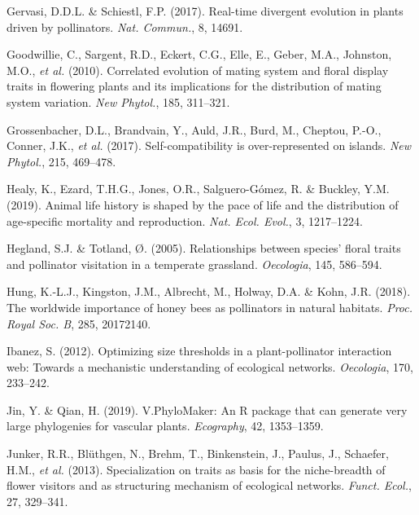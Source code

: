 \documentclass[
  12pt,
  a4paper,
]{article}
\newlength{\cslhangindent}
\newlength{\cslentryspacingunit} %
\newenvironment{CSLReferences}[2] %
 {%
  \setlength{\parindent}{0pt}
  \ifodd #1
  \let\oldpar\par
  \def\par{\hangindent=\cslhangindent\oldpar}
  \fi
  \setlength{\parskip}{#2\cslentryspacingunit}
 }%
 {}
\begin{document}
\begin{CSLReferences}{1}{0}
\leavevmode{}%
Gervasi, D.D.L. \& Schiestl, F.P. (2017). Real-time divergent evolution in plants driven by pollinators. \emph{Nat. Commun.}, 8, 14691.

\leavevmode{}%
Goodwillie, C., Sargent, R.D., Eckert, C.G., Elle, E., Geber, M.A., Johnston, M.O., \emph{et al.} (2010). Correlated evolution of mating system and floral display traits in flowering plants and its implications for the distribution of mating system variation. \emph{New Phytol.}, 185, 311--321.

\leavevmode{}%
Grossenbacher, D.L., Brandvain, Y., Auld, J.R., Burd, M., Cheptou, P.-O., Conner, J.K., \emph{et al.} (2017). Self-compatibility is over-represented on islands. \emph{New Phytol.}, 215, 469--478.

\leavevmode{}%
Healy, K., Ezard, T.H.G., Jones, O.R., Salguero-Gómez, R. \& Buckley, Y.M. (2019). Animal life history is shaped by the pace of life and the distribution of age-specific mortality and reproduction. \emph{Nat. Ecol. Evol.}, 3, 1217--1224.

\leavevmode{}%
Hegland, S.J. \& Totland, Ø. (2005). Relationships between species' floral traits and pollinator visitation in a temperate grassland. \emph{Oecologia}, 145, 586--594.

\leavevmode{}%
Hung, K.-L.J., Kingston, J.M., Albrecht, M., Holway, D.A. \& Kohn, J.R. (2018). The worldwide importance of honey bees as pollinators in natural habitats. \emph{Proc. Royal Soc. B}, 285, 20172140.

\leavevmode{}%
Ibanez, S. (2012). Optimizing size thresholds in a plant-pollinator interaction web: Towards a mechanistic understanding of ecological networks. \emph{Oecologia}, 170, 233--242.

\leavevmode{}%
Jin, Y. \& Qian, H. (2019). V.{PhyloMaker}: An {R} package that can generate very large phylogenies for vascular plants. \emph{Ecography}, 42, 1353--1359.

\leavevmode{}%
Junker, R.R., Blüthgen, N., Brehm, T., Binkenstein, J., Paulus, J., Schaefer, H.M., \emph{et al.} (2013). Specialization on traits as basis for the niche-breadth of flower visitors and as structuring mechanism of ecological networks. \emph{Funct. Ecol.}, 27, 329--341.


\end{CSLReferences}
\end{document}
